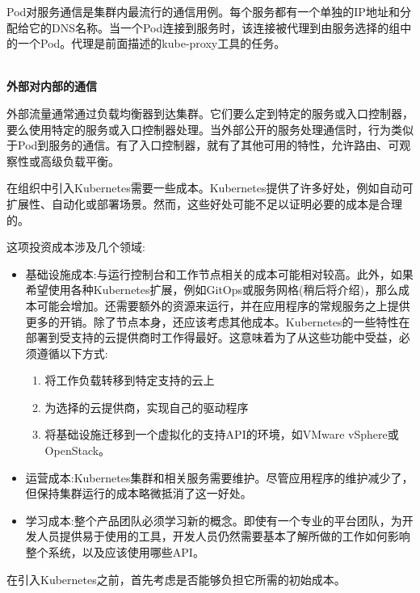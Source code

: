Pod对服务通信是集群内最流行的通信用例。每个服务都有一个单独的IP地址和分配给它的DNS名称。当一个Pod连接到服务时，该连接被代理到由服务选择的组中的一个Pod。代理是前面描述的kube-proxy工具的任务。

\hspace*{\fill} \\ %
\noindent
\textbf{外部对内部的通信}

外部流量通常通过负载均衡器到达集群。它们要么定到特定的服务或入口控制器，要么使用特定的服务或入口控制器处理。当外部公开的服务处理通信时，行为类似于Pod到服务的通信。有了入口控制器，就有了其他可用的特性，允许路由、可观察性或高级负载平衡。


在组织中引入Kubernetes需要一些成本。Kubernetes提供了许多好处，例如自动可扩展性、自动化或部署场景。然而，这些好处可能不足以证明必要的成本是合理的。

这项投资成本涉及几个领域:

\begin{itemize}
\item 
基础设施成本:与运行控制台和工作节点相关的成本可能相对较高。此外，如果希望使用各种Kubernetes扩展，例如GitOps或服务网格(稍后将介绍)，那么成本可能会增加。还需要额外的资源来运行，并在应用程序的常规服务之上提供更多的开销。除了节点本身，还应该考虑其他成本。Kubernetes的一些特性在部署到受支持的云提供商时工作得最好。这意味着为了从这些功能中受益，必须遵循以下方式:

\begin{enumerate}[label=\alph*]
\item 
将工作负载转移到特定支持的云上

\item
为选择的云提供商，实现自己的驱动程序

\item
将基础设施迁移到一个虚拟化的支持API的环境，如VMware vSphere或OpenStack。
\end{enumerate}

\item 
运营成本:Kubernetes集群和相关服务需要维护。尽管应用程序的维护减少了，但保持集群运行的成本略微抵消了这一好处。

\item 
学习成本:整个产品团队必须学习新的概念。即使有一个专业的平台团队，为开发人员提供易于使用的工具，开发人员仍然需要基本了解所做的工作如何影响整个系统，以及应该使用哪些API。
\end{itemize}

在引入Kubernetes之前，首先考虑是否能够负担它所需的初始成本。












